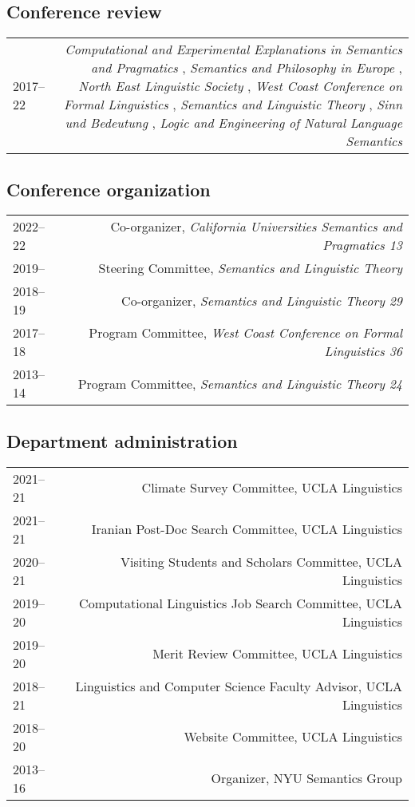 \documentclass[12pt]{article}
\begin{document}
\subsection*{Conference review}

\begin{longtable}{LR}
  2017--22 &
    \textit{Computational and Experimental Explanations in Semantics and
             Pragmatics}%
    ,
    \textit{Semantics and Philosophy in Europe}%
    ,
    \textit{North East Linguistic Society}%
    ,
    \textit{West Coast Conference on Formal Linguistics}%
    ,
    \textit{Semantics and Linguistic Theory}%
    ,
    \textit{Sinn und Bedeutung}%
    ,
    \textit{Logic and Engineering of Natural Language Semantics}%
\end{longtable}

\clearpage

\subsection*{Conference organization}

\begin{longtable}{LR}
  2022--22   & Co-organizer, \textit{California Universities Semantics and
               Pragmatics 13}\\
  2019--     & Steering Committee, \textit{Semantics and Linguistic Theory}\\
  2018--19   & Co-organizer, \textit{Semantics and Linguistic Theory 29}\\
  2017--18   & Program Committee, \textit{West Coast Conference on Formal
               Linguistics 36}\\
  2013--14   & Program Committee, \textit{Semantics and Linguistic Theory 24}
\end{longtable}

\subsection*{Department administration}

\begin{longtable}{LR}
  2021--21   & Climate Survey Committee, UCLA Linguistics\\
  2021--21   & Iranian Post-Doc Search Committee, UCLA Linguistics\\
  2020--21   & Visiting Students and Scholars Committee, UCLA Linguistics\\
  2019--20   & Computational Linguistics Job Search Committee, UCLA Linguistics\\
  2019--20   & Merit Review Committee, UCLA Linguistics\\
  2018--21   & Linguistics and Computer Science Faculty Advisor, UCLA Linguistics\\
  2018--20   & Website Committee, UCLA Linguistics\\
  2013--16   & Organizer, NYU Semantics Group
\end{longtable}
\end{document}
